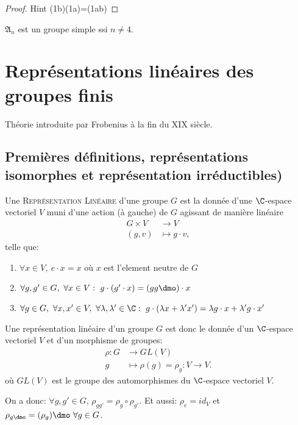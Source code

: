 \begin{proof}
	Hint (1b)(1a)=(1ab)
\end{proof}

\begin{theorem}[Galois]
	$\mathfrak{A}_n$ est un groupe simple ssi $n\neq 4$.
\end{theorem}

\chapter{Représentations linéaires des groupes finis}

Théorie introduite par Frobenius à la fin du XIX siècle.

\section{Premières définitions, représentations isomorphes et représentation irréductibles)}

\begin{definition}
	Une \textsc{Représentation Linéaire} d'une groupe $G$ est la donnée d'une $\C$-espace vectoriel $V$ muni d'une action (à gauche) de $G$ agissant de manière linéaire
	\begin{align*}
		G\times V & \rightarrow V \\
		(g,v) & \mapsto g\cdot v,		
	\end{align*}
	telle que:
	\begin{enumerate}
		\item $\forall x\in V,\ e\cdot x=x$ où $x$ est l'element neutre de $G$
		\item $\forall g, g' \in G,\ \forall x\in V:\ g\cdot (g'\cdot x)=(gg\dmo)\cdot x$
		\item $\forall g\in G,\ \forall x,x'\in V,\ \forall \lambda,\lambda'\in\C:\ g\cdot(\lambda x+\lambda'x')=\lambda g\cdot x+\lambda' g\cdot x'$
	\end{enumerate}
\end{definition}

\begin{definition}
Une représentation linéaire d'un groupe $G$ est donc le donnée d'un $\C$-espace vectoriel $V$ et d'un morphisme de groupes:
\begin{align*}
	\rho:G &\rightarrow GL(V)\\
	g &\mapsto \rho(g)=\rho_g:V\rightarrow V.	
\end{align*}                
où $GL(V)$ est le groupe des automorphismes du $\C$-espace vectoriel $V$.

On a donc: $\forall g,g'\in G$, $\rho_{gg'}=\rho_g\circ \rho_{g'}$. Et aussi: $\rho_e=id_V$ et $\rho_{g\dmo}=(\rho_g)\dmo\ \forall g\in G$.
\end{definition}

